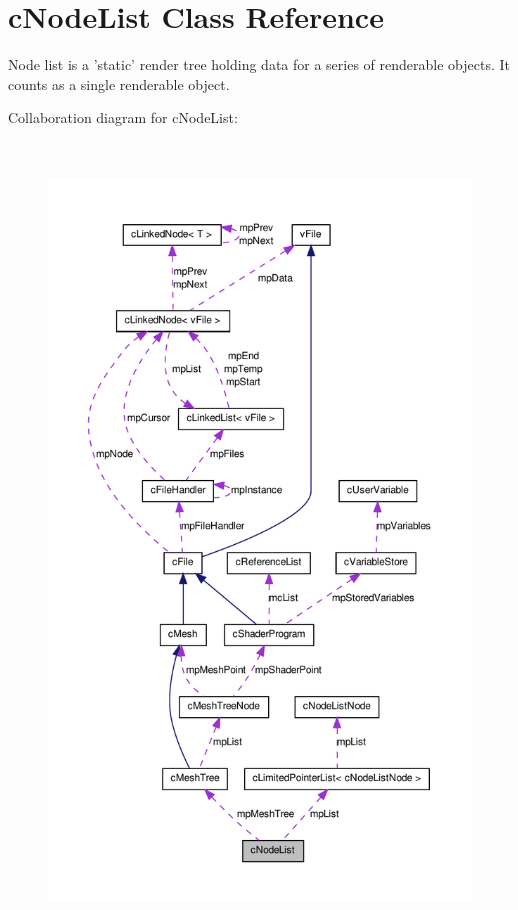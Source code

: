 \hypertarget{classc_node_list}{
\section{cNodeList Class Reference}
\label{classc_node_list}
}


Node list is a 'static' render tree holding data for a series of renderable objects. It counts as a single renderable object.  




Collaboration diagram for cNodeList:\nopagebreak
\begin{figure}[H]
\begin{center}
\leavevmode
\includegraphics[height=600pt]{classc_node_list__coll__graph}
\end{center}
\end{figure}
